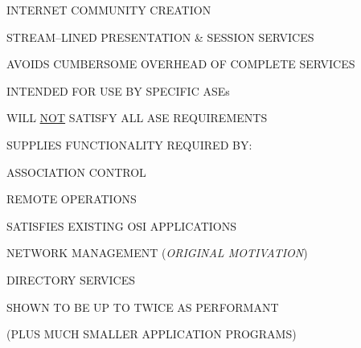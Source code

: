 %




\begin{bwslide}

\begin{nrtc}
\item	INTERNET COMMUNITY CREATION
\item	STREAM--LINED PRESENTATION \& SESSION SERVICES
\item	AVOIDS CUMBERSOME OVERHEAD OF COMPLETE SERVICES
\item	INTENDED FOR USE BY SPECIFIC ASEs
\item	WILL \underline{NOT} SATISFY ALL ASE REQUIREMENTS
\end{nrtc}
\end{bwslide}


\begin{bwslide}

\begin{nrtc}
\item	SUPPLIES FUNCTIONALITY REQUIRED BY:
	\begin{nrtc}
	\item	ASSOCIATION CONTROL
	\item	REMOTE OPERATIONS
	\end{nrtc}
\item	SATISFIES EXISTING OSI APPLICATIONS
	\begin{nrtc}
	\item	NETWORK MANAGEMENT ({\em ORIGINAL MOTIVATION})
	\item	DIRECTORY SERVICES
	\end{nrtc}
\item	SHOWN TO BE UP TO TWICE AS PERFORMANT
	\begin{nrtc}
	\item	(PLUS MUCH SMALLER APPLICATION PROGRAMS)
	\end{nrtc}
\end{nrtc}
\end{bwslide}


